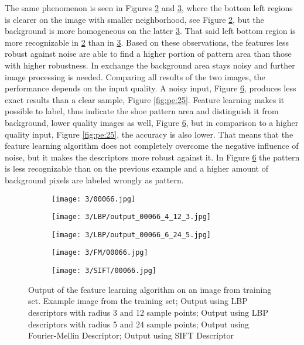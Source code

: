 \documentclass[draft,final]{vutinfth} %
\begin{document}
The same phenomenon is seen in Figures  \ref{fig:pe:66:LBPs} and  \ref{fig:pe:66:LBPb}, where the bottom left regions is clearer on the image  with smaller neighborhood, see Figure \ref{fig:pe:66:LBPs}, but the background is more homogeneous on the latter \ref{fig:pe:66:LBPb}. 
That said left bottom region is more recognizable in  \ref{fig:pe:66:LBPs} than in  \ref{fig:pe:66:LBPb}.
Based on these observations,  the features less robust against noise are able to find a higher portion of pattern area than those with higher robustness.
In exchange the background area stays noisy and further image processing is needed.
Comparing all results of the two images, the performance depends on the input quality.
A noisy input, Figure \ref{fig:pe:66}, produces less exact results than a clear sample, Figure \ref{fig:pe:25}.
Feature learning makes it possible to label, thus indicate the shoe pattern area and distinguish it from background, lower quality images as well,  Figure \ref{fig:pe:66}, but in comparison to a higher quality input, Figure \ref{fig:pe:25}, the accuracy is also lower.
That means that the feature learning algorithm does not completely overcome the negative influence of noise, but it makes the descriptors more robust against it.
In Figure \ref{fig:pe:66} the pattern is less recognizable than on the previous example and a higher amount of background pixels are labeled wrongly as pattern.

\begin{figure}[h]
  \centering
  \begin{subfigure}[t]{0.19\columnwidth}
    \centering
    \texttt{[image: 3/00066.jpg]}
    \subcaption{}
    \label{fig:pe:66:orig}
  \end{subfigure}
  \begin{subfigure}[t]{0.19\columnwidth}
    \centering
    \texttt{[image: 3/LBP/output\_00066\_4\_12\_3.jpg]}
    \subcaption{}
    \label{fig:pe:66:LBPs}
  \end{subfigure}
  \begin{subfigure}[t]{0.19\columnwidth}
    \centering
    \texttt{[image: 3/LBP/output\_00066\_6\_24\_5.jpg]}
    \subcaption{}
    \label{fig:pe:66:LBPb}
  \end{subfigure}
  \begin{subfigure}[t]{0.19\columnwidth}
    \centering
    \texttt{[image: 3/FM/00066.jpg]}
    \subcaption{}
    \label{fig:pe:66:FM}
  \end{subfigure}
  \begin{subfigure}[t]{0.19\columnwidth}
    \centering
    \texttt{[image: 3/SIFT/00066.jpg]}
    \subcaption{}
    \label{fig:pe:66:SIFT}
  \end{subfigure}
  \caption{Output of the feature learning algorithm on an image from training set.  Example image from the training set;  Output using LBP descriptors with radius 3 and 12 sample points;  Output using LBP descriptors with radius 5 and 24 sample points;  Output using Fourier-Mellin Descriptor;  Output using SIFT Descriptor}
  \label{fig:pe:66}
\end{figure}
\end{document}
